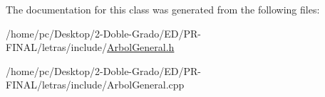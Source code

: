 The documentation for this class was generated from the following files\-:\begin{DoxyCompactItemize}
\item 
/home/pc/\-Desktop/2-\/\-Doble-\/\-Grado/\-E\-D/\-P\-R-\/\-F\-I\-N\-A\-L/letras/include/\hyperlink{ArbolGeneral_8h}{Arbol\-General.\-h}\item 
/home/pc/\-Desktop/2-\/\-Doble-\/\-Grado/\-E\-D/\-P\-R-\/\-F\-I\-N\-A\-L/letras/include/Arbol\-General.\-cpp\end{DoxyCompactItemize}
